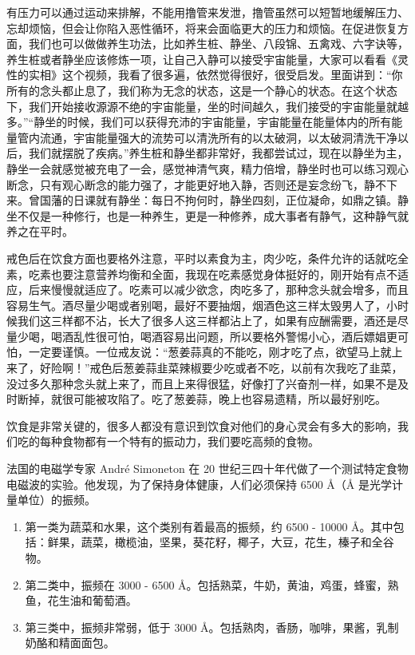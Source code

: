 有压力可以通过运动来排解，不能用撸管来发泄，撸管虽然可以短暂地缓解压力、忘却烦恼，但会让你陷入恶性循环，将来会面临更大的压力和烦恼。在促进恢复方面，我们也可以做做养生功法，比如养生桩、静坐、八段锦、五禽戏、六字诀等，养生桩或者静坐应该修炼一项，让自己入静可以接受宇宙能量，大家可以看看《灵性的实相》这个视频，我看了很多遍，依然觉得很好，很受启发。里面讲到：“你所有的念头都止息了，我们称为无念的状态，这是一个静心的状态。在这个状态下，我们开始接收源源不绝的宇宙能量，坐的时间越久，我们接受的宇宙能量就越多。”“静坐的时候，我们可以获得充沛的宇宙能量，宇宙能量在能量体内的所有能量管内流通，宇宙能量强大的流势可以清洗所有的以太破洞，以太破洞清洗干净以后，我们就摆脱了疾病。”养生桩和静坐都非常好，我都尝试过，现在以静坐为主，静坐一会就感觉被充电了一会，感觉神清气爽，精力倍增，静坐时也可以练习观心断念，只有观心断念的能力强了，才能更好地入静，否则还是妄念纷飞，静不下来。曾国藩的日课就有静坐：每日不拘何时，静坐四刻，正位凝命，如鼎之镇。静坐不仅是一种修行，也是一种养生，更是一种修养，成大事者有静气，这种静气就养之在平时。

戒色后在饮食方面也要格外注意，平时以素食为主，肉少吃，条件允许的话就吃全素，吃素也要注意营养均衡和全面，我现在吃素感觉身体挺好的，刚开始有点不适应，后来慢慢就适应了。吃素可以减少欲念，肉吃多了，那种念头就会增多，而且容易生气。酒尽量少喝或者别喝，最好不要抽烟，烟酒色这三样太毁男人了，小时候我们这三样都不沾，长大了很多人这三样都沾上了，如果有应酬需要，酒还是尽量少喝，喝酒乱性很可怕，喝酒容易出问题，所以要格外警惕小心，酒后嫖娼更可怕，一定要谨慎。一位戒友说：“葱姜蒜真的不能吃，刚才吃了点，欲望马上就上来了，好险啊！”戒色后葱姜蒜韭菜辣椒要少吃或者不吃，以前有次我吃了韭菜，没过多久那种念头就上来了，而且上来得很猛，好像打了兴奋剂一样，如果不是及时断掉，就很可能被攻陷了。吃了葱姜蒜，晚上也容易遗精，所以最好别吃。

饮食是非常关键的，很多人都没有意识到饮食对他们的身心灵会有多大的影响，我们吃的每种食物都有一个特有的振动力，我们要吃高频的食物。

法国的电磁学专家 André Simoneton 在 20 世纪三四十年代做了一个测试特定食物电磁波的实验。他发现，为了保持身体健康，人们必须保持 6500 \unit{\angstrom}（\unit{\angstrom} 是光学计量单位）的振频。

\begin{enumerate}
    \item 第一类为蔬菜和水果，这个类别有着最高的振频，约 6500 - 10000 \unit{\angstrom}。其中包括：鲜果，蔬菜，橄榄油，坚果，葵花籽，椰子，大豆，花生，榛子和全谷物。
    \item 第二类中，振频在 3000 - 6500 \unit{\angstrom}。包括熟菜，牛奶，黄油，鸡蛋，蜂蜜，熟鱼，花生油和葡萄酒。
    \item 第三类中，振频非常弱，低于 3000 \unit{\angstrom}。包括熟肉，香肠，咖啡，果酱，乳制奶酪和精面面包。
\end{enumerate}

